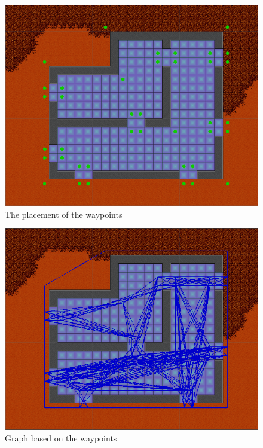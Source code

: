 \begin{figure}[H]
	\includegraphics[width=\textwidth]{figures/astar/waypoints}
	\caption{The placement of the waypoints}
	\label{waypointsNode}
\end{figure}

\begin{figure}[H]
	\includegraphics[width=\textwidth]{figures/astar/waypointsGraph}
	\caption{Graph based on the waypoints}
	\label{waypointgraph}
\end{figure}

